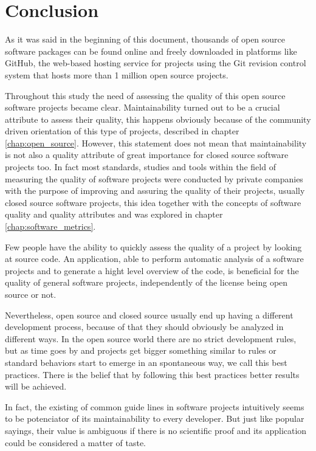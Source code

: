 \thispagestyle{empty}
\chapter{Conclusion}\label{chap:conclusion}


As it was said in the beginning of this document, thousands of open source software packages can be found online and 
freely downloaded in platforms like GitHub,
the web-based hosting service for projects using the Git revision control system that 
hosts more than 1 million open source projects.

Throughout this study the need of assessing the quality of this open source software projects became clear.
Maintainability turned out to be a crucial attribute to assess their quality, 
this happens obviously because of the community driven orientation of this type of projects, 
described in chapter \ref{chap:open_source}. 
However, this statement does not mean that maintainability is not also a quality attribute of great importance
for closed source software projects too. 
In fact most standards, studies and tools within the field of measuring the quality of software projects 
were conducted by private companies with the purpose of improving and assuring the quality of their projects,
usually closed source software projects, this idea together with the concepts of software quality and 
quality attributes and was explored in chapter \ref{chap:software_metrics}.

Few people have the ability to quickly assess the quality of a project by looking at source code. 
An application, able to perform automatic analysis of a software projects and to generate a hight level overview of the code,
is beneficial for the quality of general software projects, independently of the license being open source or not.

Nevertheless, open source and closed source usually end up having a different development process, 
because of that they should obviously be analyzed in different ways.
In the open source world there are no strict development rules, 
but as time goes by and projects get bigger something similar to rules
or standard behaviors start to emerge in an spontaneous way, we call this best practices.
There is the belief that by following this best practices better results will be achieved.

In fact, the existing of common guide lines in software projects intuitively seems to be potenciator of its 
maintainability to every developer.
But just like popular sayings, their value is ambiguous if there is no scientific proof and 
its application could be considered a matter of taste.

